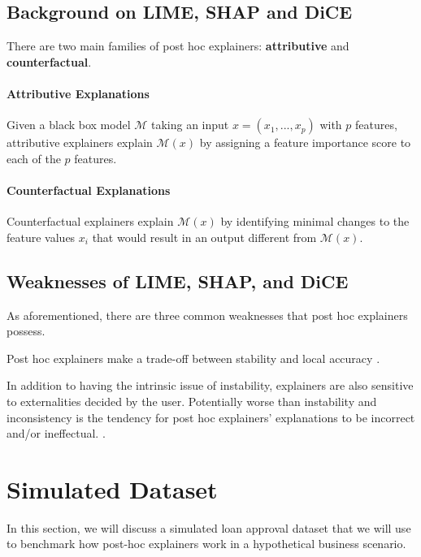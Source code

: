 \documentclass[12pt]{article}    %
\begin{document}
    \subsection{Background on LIME, SHAP and DiCE}
    There are two main families of post hoc explainers: \textbf{attributive} and \textbf{counterfactual}. 
    
    \paragraph{Attributive Explanations} Given a black box model $\mathcal{M}$ taking an input $x=(x_1,...,x_p)$ with $p$ features, attributive explainers explain $\mathcal{M}(x)$ by assigning a feature importance score to each of the $p$ features.


 \paragraph{Counterfactual Explanations}   Counterfactual explainers explain $\mathcal{M}(x)$ by identifying minimal changes to the feature values $x_i$ that would result in an output different from $\mathcal{M}(x)$.

    \subsection{Weaknesses of LIME, SHAP, and DiCE}
        \label{sec:weaknesses}
        As aforementioned, there are three common weaknesses that post hoc explainers possess. 
    

    Post hoc explainers make a trade-off between stability and local accuracy \citep{alvarez18robustness, laugel18defining}. 


    In addition to having the intrinsic issue of instability, explainers are also sensitive to externalities decided by the user. 
    Potentially worse than instability and inconsistency is the tendency for post hoc explainers' explanations to be incorrect and/or ineffectual. \citep{Krishna2022TheDP,kumar20shap,weerts19human,dieber20assessing,yacoby22judges}. 
    


\section{Simulated Dataset}
\label{sec:dataset}
In this section, we will discuss a simulated loan approval dataset that we will use to benchmark how post-hoc explainers work in a hypothetical business scenario.
 
\end{document}
